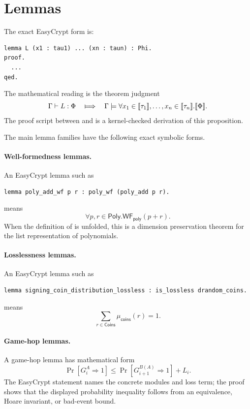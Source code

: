 \section{Lemmas}
\label{app:semantic-lemmas}

The exact EasyCrypt form is:

\begin{lstlisting}[language=EasyCrypt]
lemma L (x1 : tau1) ... (xn : taun) : Phi.
proof.
  ...
qed.
\end{lstlisting}

The mathematical reading is the theorem judgment
\[
  \Gamma\vdash L:\Phi
  \quad\Longmapsto\quad
  \Gamma\models
  \forall x_1\in\ECsem{\tau_1},\ldots,x_n\in\ECsem{\tau_n}.
  \ECsem{\Phi}.
\]
The proof script between  and  is a kernel-checked
derivation of this proposition.

The main lemma families have the following exact symbolic forms.

\paragraph{Well-formedness lemmas.}
An EasyCrypt lemma such as
\begin{lstlisting}[language=EasyCrypt]
lemma poly_add_wf p r : poly_wf (poly_add p r).
\end{lstlisting}
means
\[
  \forall p,r\in\mathsf{Poly}.
  \mathsf{WF}_{\mathsf{poly}}(p+r).
\]
When the definition of  is unfolded, this is a dimension
preservation theorem for the list representation of polynomials.

\paragraph{Losslessness lemmas.}
An EasyCrypt lemma such as
\begin{lstlisting}[language=EasyCrypt]
lemma signing_coin_distribution_lossless : is_lossless drandom_coins.
\end{lstlisting}
means
\[
  \sum_{r\in\mathsf{Coins}}\mu_{\mathsf{coins}}(r)=1.
\]

\paragraph{Game-hop lemmas.}
A game-hop lemma has mathematical form
\[
  \Pr[G_i^A\Rightarrow 1]
  \le
  \Pr[G_{i+1}^{B(A)}\Rightarrow 1]+L_i.
\]
The EasyCrypt statement names the concrete modules and loss term; the proof
shows that the displayed probability inequality follows from an equivalence,
Hoare invariant, or bad-event bound.

